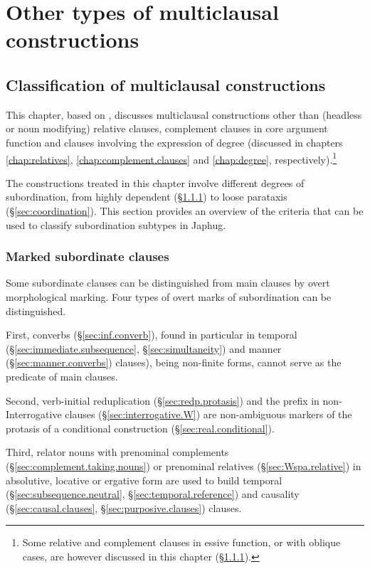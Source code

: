 \chapter{Other types of multiclausal constructions} \label{chap:temporal.conditional}


\section{Classification of multiclausal constructions }
This chapter, based on \citet{jacques14linking}, discusses multiclausal constructions other than (headless or noun modifying) relative clauses, complement clauses in core argument function and clauses involving the expression of degree (discussed in chapters \ref{chap:relatives}, \ref{chap:complement.clauses} and \ref{chap:degree}, respectively).\footnote{Some relative and complement clauses in essive function, or with oblique cases, are however discussed in this chapter (§\ref{sec:marked.subordinate}). } 

The constructions treated in this chapter involve different degrees of subordination, from highly dependent (§\ref{sec:marked.subordinate}) to loose parataxis (§\ref{sec:coordination}). This section provides an overview of the criteria that can be used to classify subordination subtypes in Japhug.

\subsection{Marked subordinate clauses}  \label{sec:marked.subordinate}
Some subordinate clauses can be distinguished from main clauses by overt morphological marking. Four types of overt marks of subordination can be distinguished.

First, converbs (§\ref{sec:inf.converb}), found in particular in temporal (§\ref{sec:immediate.subsequence}, §\ref{sec:simultaneity}) and manner (§\ref{sec:manner.converbs}) clauses), being non-finite forms, cannot serve as the predicate of main clauses. 

Second, verb-initial reduplication (§\ref{sec:redp.protasis}) and the prefix  in non-Interrogative clauses (§\ref{sec:interrogative.W}) are non-ambiguous markers of the protasis of a conditional construction (§\ref{sec:real.conditional}).

Third, relator nouns with prenominal complements (§\ref{sec:complement.taking.nouns}) or prenominal relatives (§\ref{sec:Wspa.relative}) in absolutive, locative or ergative form are used to build temporal (§\ref{sec:subsequence.neutral}, §\ref{sec:temporal.reference}) and causality (§\ref{sec:causal.clauses}, §\ref{sec:purposive.clauses}) clauses.

